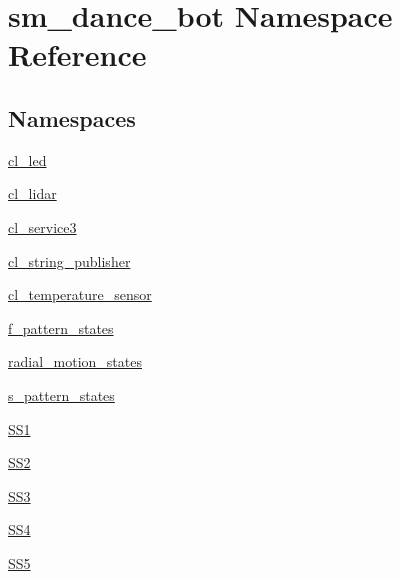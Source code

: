 \hypertarget{namespacesm__dance__bot}{}\section{sm\+\_\+dance\+\_\+bot Namespace Reference}
\label{namespacesm__dance__bot}
\subsection*{Namespaces}
\begin{DoxyCompactItemize}
\item 
 \hyperlink{namespacesm__dance__bot_1_1cl__led}{cl\+\_\+led}
\item 
 \hyperlink{namespacesm__dance__bot_1_1cl__lidar}{cl\+\_\+lidar}
\item 
 \hyperlink{namespacesm__dance__bot_1_1cl__service3}{cl\+\_\+service3}
\item 
 \hyperlink{namespacesm__dance__bot_1_1cl__string__publisher}{cl\+\_\+string\+\_\+publisher}
\item 
 \hyperlink{namespacesm__dance__bot_1_1cl__temperature__sensor}{cl\+\_\+temperature\+\_\+sensor}
\item 
 \hyperlink{namespacesm__dance__bot_1_1f__pattern__states}{f\+\_\+pattern\+\_\+states}
\item 
 \hyperlink{namespacesm__dance__bot_1_1radial__motion__states}{radial\+\_\+motion\+\_\+states}
\item 
 \hyperlink{namespacesm__dance__bot_1_1s__pattern__states}{s\+\_\+pattern\+\_\+states}
\item 
 \hyperlink{namespacesm__dance__bot_1_1SS1}{S\+S1}
\item 
 \hyperlink{namespacesm__dance__bot_1_1SS2}{S\+S2}
\item 
 \hyperlink{namespacesm__dance__bot_1_1SS3}{S\+S3}
\item 
 \hyperlink{namespacesm__dance__bot_1_1SS4}{S\+S4}
\item 
 \hyperlink{namespacesm__dance__bot_1_1SS5}{S\+S5}
\end{DoxyCompactItemize}
